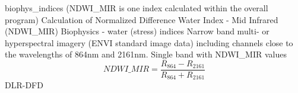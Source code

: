 %
{ %
biophys\_indices (NDWI\_MIR is one index calculated within the overall program)
}
%
{ %
Calculation of Normalized Difference Water Index - Mid Infrared (NDWI\_MIR)
}
%
{ %
Biophysics - water (stress) indices
}
%
{ %
Narrow band multi- or hyperspectral imagery (ENVI standard image data) including channels close to the wavelengths of 864nm and 2161nm.\bigskip
}
%
{ %
Single band with NDWI\_MIR values
}
%
{ %
\begin{displaymath}
NDWI\_MIR = \frac{R_{864}-R_{2161}}{R_{864}+R_{2161}}
\end{displaymath}
}
%
{ %
DLR-DFD
}
%
{ %

}
